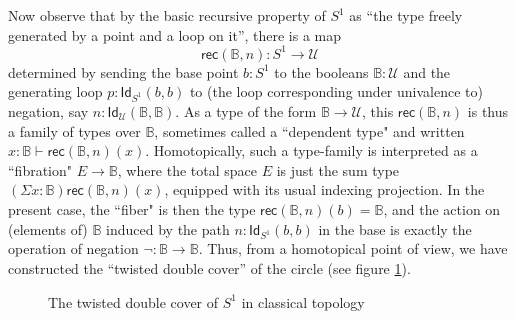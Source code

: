 \documentclass[11pt]{article}
\newcommand{\B}{\ensuremath{\mathbb{B}}}
\newcommand{\Id}{\mathsf{Id}}
\newcommand{\id}[1]{\Id_{#1}}
\newcommand{\rec}{\mathsf{rec}}
\newcommand{\U}{\ensuremath{\mathcal{U}}}
\theoremstyle{remark}
\theoremstyle{definition}
\begin{document}
Now observe that by the basic recursive property of $S^1$ as ``the type freely generated by a point and a loop on it'', there is a map $$\rec(\B,n): S^1 \to \U$$ determined by sending the base point $b:S^1$ to the booleans $\B:\U$ and the generating loop $p : \id{S^1}(b,b)$ to (the loop corresponding under univalence to) negation, say $n : \id{\U}(\B,\B)$.  As a type of the form $\B\to\U$, this $\rec(\B,n)$ is thus a family of types over $\B$, sometimes called a ``dependent type" and written $x:\B \vdash \rec(\B,n)(x)$.  Homotopically, such a type-family is interpreted as a ``fibration" $E\to\B$, where the total space $E$ is just the sum type $(\Sigma{x:\B})\rec(\B,n)(x)$, equipped with its usual indexing projection.  In the present case, the ``fiber" is then the type $\rec(\B,n)(b) = \B$, and the action on (elements of) $\B$ induced by the path $n: \id{S^1}(b,b)$ in the base is exactly the operation of negation $\neg : \B\to \B$.  Thus, from a homotopical point of view, we have constructed the ``twisted double cover'' of the circle (see figure \ref{fig:winding}).
\begin{figure}\centering
  \caption{The twisted double cover of $S^1$ in classical topology}\label{fig:winding}
\end{figure}
%
\end{document}
